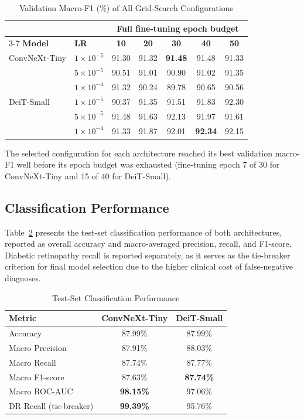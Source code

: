 \begin{table}[htbp]
\caption{Validation Macro-F1 (\%) of All Grid-Search Configurations}
\label{tab:grid_search}
\centering
\begin{tabular*}{\columnwidth}{@{\extracolsep{\fill}}llccccc@{}}
\toprule
 & & \multicolumn{5}{c}{\textbf{Full fine-tuning epoch budget}} \\
\cmidrule{3-7}
\textbf{Model} & \textbf{LR} & \textbf{10} & \textbf{20} & \textbf{30} & \textbf{40} & \textbf{50} \\
\midrule
ConvNeXt-Tiny & $1\times10^{-5}$ & 91.30 & 91.32 & \textbf{91.48} & 91.48 & 91.33 \\
 & $5\times10^{-5}$ & 90.51 & 91.01 & 90.90 & 91.02 & 91.35 \\
 & $1\times10^{-4}$ & 91.32 & 90.24 & 89.78 & 90.65 & 90.56 \\
\midrule
DeiT-Small & $1\times10^{-5}$ & 90.37 & 91.35 & 91.51 & 91.83 & 92.30 \\
 & $5\times10^{-5}$ & 91.48 & 91.63 & 92.13 & 91.97 & 91.61 \\
 & $1\times10^{-4}$ & 91.33 & 91.87 & 92.01 & \textbf{92.34} & 92.15 \\
\bottomrule
\end{tabular*}
\end{table}

The selected configuration for each architecture reached its best validation macro-F1 well before its epoch budget was exhausted (fine-tuning epoch 7 of 30 for ConvNeXt-Tiny and 15 of 40 for DeiT-Small).

\subsection{Classification Performance}

Table~\ref{tab:classification_performance} presents the test-set classification performance of both architectures, reported as overall accuracy and macro-averaged precision, recall, and F1-score.
Diabetic retinopathy recall is reported separately, as it serves as the tie-breaker criterion for final model selection due to the higher clinical cost of false-negative diagnoses.

\begin{table}[htbp]
\caption{Test-Set Classification Performance}
\label{tab:classification_performance}
\centering
\begin{tabular*}{\columnwidth}{@{\extracolsep{\fill}}lcc@{}}
\toprule
\textbf{Metric} & \textbf{ConvNeXt-Tiny} & \textbf{DeiT-Small} \\
\midrule
Accuracy & 87.99\% & 87.99\% \\
Macro Precision & 87.91\% & 88.03\% \\
Macro Recall & 87.74\% & 87.77\% \\
Macro F1-score & 87.63\% & \textbf{87.74\%} \\
Macro ROC-AUC & \textbf{98.15\%} & 97.06\% \\
DR Recall (tie-breaker) & \textbf{99.39\%} & 95.76\% \\
\bottomrule
\end{tabular*}
\end{table}


